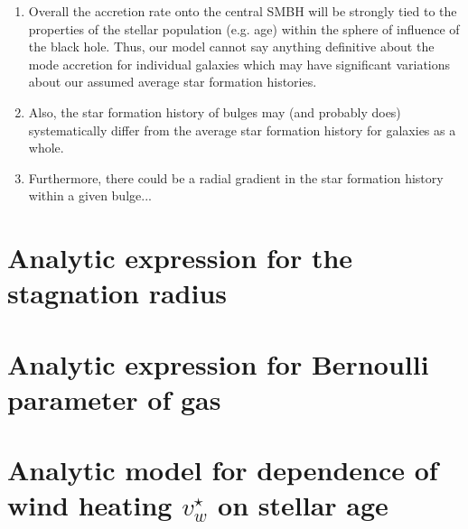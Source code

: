\documentclass[usenatbib,fleqn]{mn2e}
\newcommand{\vwO}{v_{w}}
\begin{document}
    \begin{enumerate}
    \item Overall the accretion rate onto the central SMBH will be strongly
    tied to the properties of the stellar population (e.g. age) within
    the sphere of influence of the black hole. Thus, our model cannot
    say anything definitive about the mode accretion for individual
    galaxies which may have significant variations about our assumed
    average star formation histories.
    \item Also, the star formation history of bulges may (and probably
      does) systematically differ from the average star formation
      history for galaxies as a whole.
    \item Furthermore, there could be a radial gradient in the star
      formation history within a given bulge... 
    \end{enumerate}
  

  


  \clearpage
  \appendix
  \section{Analytic expression for the stagnation radius}
  \label{app:rs}
  

  \section{Analytic expression for Bernoulli parameter of gas}
  \label{app:be}
  

  \section{Analytic model for dependence of wind heating $\vwO^{\star}$ on stellar age}
\label{app:windheat}


  \footnotesize{
    
    
  }
\end{document}
